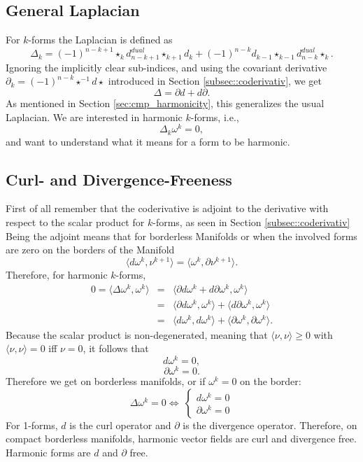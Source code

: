 \subsection{General Laplacian}
For $k$-forms the Laplacian is defined as 
\[\Delta_k = (-1)^{n-k+1}\star_{k} d_{n-k+1}^{dual} \star_{k+1}d_k + (-1)^{n-k}d_{k-1}\star_{k-1}d_{n-k}^{dual} \star_{k}.\]
Ignoring the implicitly clear sub-indices, and using the covariant derivative $\partial_k = (-1)^{n-k}\star^{-1} d \star$ introduced in Section \ref{subsec::coderivativ}, we get 
\[\Delta = \partial d + d \partial .\]
As mentioned in Section \ref{sec:cmp_harmonicity}, this generalizes the usual Laplacian. We are interested in harmonic $k$-forms, i.e.,
\[\Delta_k \omega^k = 0,\]
and want to understand what it means for a form to be harmonic. 

\subsection{Curl- and Divergence-Freeness}
First of all remember that the coderivative is adjoint to the derivative with respect to the scalar product for $k$-forms, as seen in Section \ref{subsec::coderivativ}
Being the adjoint means that for borderless Manifolds or when the involved forms are zero on the borders of the Manifold
\[\langle d\omega^k, \nu^{k+1} \rangle = \langle \omega^k,\partial\nu^{k+1}\rangle.\]
Therefore, for harmonic $k$-forms,
\begin{eqnarray*}0=\langle\Delta\omega^k,\omega^k\rangle &= &\langle \partial d\omega^k + d \partial \omega^k, \omega^k\rangle \\
 &=& \langle \partial d\omega^k, \omega^k\rangle + \langle d \partial \omega^k, \omega^k\rangle \\
 &=& \langle d\omega^k,d\omega^k\rangle + \langle \partial\omega^k,\partial\omega^k\rangle.
\end{eqnarray*}
Because the scalar product is non-degenerated, meaning that $\langle \nu,\nu\rangle \geq 0$  with  $\langle \nu,\nu\rangle = 0$ iff $\nu=0$, it follows that
\[d\omega^k = 0,\]
\[\partial\omega^k = 0.\]
Therefore we get on borderless manifolds, or if $\omega^k = 0$ on the border:
\[\Delta \omega^k = 0 \Leftrightarrow \: \left\{\begin{matrix}
d\omega^k = 0\\
\partial \omega^k = 0
\end{matrix}\right.\]
For 1-forms, $d$ is the curl operator and $\partial$ is the divergence operator. Therefore, on compact borderless manifolds, harmonic vector fields are curl and divergence free. Harmonic forms are $d$ and $\partial$ free. 
